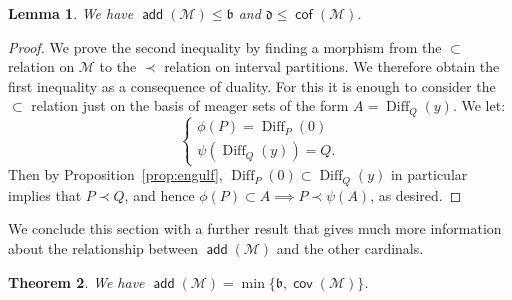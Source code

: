 \documentclass[11pt,oneside]{amsbook}
\newcommand{\Meager}{\mathcal M}
\DeclareMathOperator{\add}{\mathsf{add}}
\DeclareMathOperator{\cov}{\mathsf{cov}}
\DeclareMathOperator{\cof}{\mathsf{cof}}
\DeclareMathOperator{\Diff}{Diff}
\theoremstyle{definition}
\theoremstyle{plain}
\newtheorem{thm}{Theorem}[section]
\newtheorem{lem}[thm]{Lemma}
\theoremstyle{definition}
\theoremstyle{remark}
\begin{document}
\begin{lem}
  We have $\add(\Meager)\leq\mathfrak b$ and $\mathfrak d\leq\cof(\Meager)$.
\end{lem}

\begin{proof}
  We prove the second inequality by finding a morphism from the $\subset$ relation on $\Meager$ to the $\prec$ relation on interval partitions. We therefore obtain the first inequality as a consequence of duality. For this it is enough to consider the $\subset$ relation just on the basis of meager sets of the form $A=\Diff_Q(y)$. We let:
  \[\begin{cases}\phi(P)=\Diff_P(0)\\\psi(\Diff_Q(y))=Q\text{.}\end{cases}
  \]
  Then by Proposition~\ref{prop:engulf}, $\Diff_P(0)\subset\Diff_Q(y)$ in particular implies that $P\prec Q$, and hence $\phi(P)\subset A\implies P\prec\psi(A)$, as desired.
\end{proof}

We conclude this section with a further result that gives much more information about the relationship between $\add(\Meager)$ and the other cardinals.

\begin{thm}
  We have $\add(\Meager)=\min\{\mathfrak b,\cov(\Meager)\}$.
\end{thm}
\end{document}
